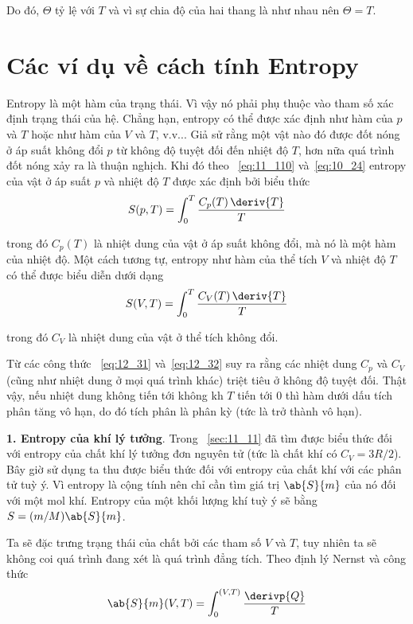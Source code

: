 \noindent
Do đó, $\Theta$ tỷ lệ với $T$ và vì sự chia độ của hai thang là như nhau nên $\Theta=T$.

\section{Các ví dụ về cách tính Entropy}\label{sec:12_4}

Entropy là một hàm của trạng thái. Vì vậy nó phải phụ thuộc vào tham số xác định trạng thái của hệ. Chẳng hạn, entropy có thể được xác định như hàm của $p$ và $T$ hoặc như hàm của $V$ và $T$, v.v... Giả sử rằng một vật nào đó được đốt nóng ở áp suất không đổi $p$ từ không độ tuyệt đối đến nhiệt độ $T$, hơn nữa quá trình đốt nóng xảy ra là thuận nghịch. Khi đó theo ~\eqref{eq:11_110} và~\eqref{eq:10_24} entropy của vật ở áp suất $p$ và nhiệt độ $T$ được xác định bởi biểu thức
\begin{equation}\label{eq:12_31}
	S(p,T) = \int_{0}^{T} \frac{C_p(T)\,\deriv{T}}{T}
\end{equation}

\noindent
trong đó $C_p(T)$ là nhiệt dung của vật ở áp suất không đổi, mà nó là một hàm của nhiệt độ. Một cách tương tự, entropy như hàm của thể tích $V$ và nhiệt độ $T$ có thể được biểu diễn dưới dạng
\begin{equation}\label{eq:12_32}
	S(V,T) = \int_{0}^{T} \frac{C_V(T)\,\deriv{T}}{T}
\end{equation}

\noindent
trong đó $C_V$ là nhiệt dung của vật ở thể tích không đổi.

Từ các công thức ~\eqref{eq:12_31} và~\eqref{eq:12_32} suy ra rằng các nhiệt dung $C_p$ và $C_V$ (cũng như nhiệt dung ở mọi quá trình khác) triệt tiêu ở không độ tuyệt đối. Thật vậy, nếu nhiệt dung không tiến tới không kh $T$ tiến tới 0 thì hàm dưới dấu tích phân tăng vô hạn, do đó tích phân là phân kỳ (tức là trở thành vô hạn).

\textbf{1. Entropy của khí lý tưởng}. Trong ~\ref{sec:11_11} đã tìm được biểu thức đối với entropy của chất khí lý tưởng đơn nguyên tử (tức là chất khí có $C_V=3R/2$). Bây giờ sử dụng  ta thu được biểu thức đối với entropy của chất khí với các phân tử tuỳ ý. Vì entropy là cộng tính nên chỉ cần tìm giá trị $\ab{S}{m}$ của nó đối với một mol khí. Entropy của một khối lượng khí tuỳ ý sẽ bằng $S=(m/M)\ab{S}{m}$.

Ta sẽ đặc trưng trạng thái của chất bởi các tham số $V$ và $T$, tuy nhiên ta sẽ không coi quá trình đang xét là quá trình đẳng tích. Theo định lý Nernst và công thức 
\begin{equation}\label{eq:12_33}
	\ab{S}{m}(V,T) = \int_{0}^{(V,T)} \frac{\derivp{Q}}{T}
\end{equation}

